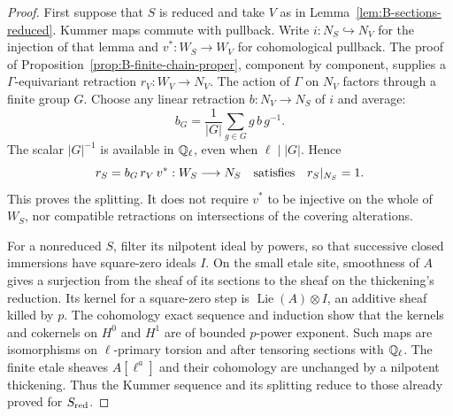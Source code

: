 \begin{proof}
First suppose that \(S\) is reduced and take \(V\) as in
Lemma~\ref{lem:B-sections-reduced}.  Kummer maps commute with
pullback.  Write \(i:N_S\hookrightarrow N_V\) for the
injection of that lemma and \(v^*:W_S\to W_V\) for
cohomological pullback.  The proof of
Proposition~\ref{prop:B-finite-chain-proper}, component by
component, supplies a \(\Gamma\)-equivariant retraction
\(r_V:W_V\to N_V\).  The action of \(\Gamma\) on
\(N_V\) factors through a finite group \(G\).  Choose any
linear retraction \(b:N_V\to N_S\) of \(i\) and average:
\[
 b_G=\frac1{|G|}\sum_{g\in G}g\,b\,g^{-1}.
\]
The scalar \(|G|^{-1}\) is available in \(\mathbb Q_\ell\),
even when \(\ell\mid |G|\).  Hence
\[
 r_S=b_G\,r_V\,v^*:W_S\longrightarrow N_S
 \quad\hbox{satisfies}\quad r_S|_{N_S}=1.
\]
This proves the splitting.  It does not require \(v^*\) to be
injective on the whole of \(W_S\), nor compatible retractions
on intersections of the covering alterations.

For a nonreduced \(S\), filter its nilpotent ideal by powers,
so that successive closed immersions have square-zero ideals
\(I\).  On the small etale site, smoothness of \(A\) gives
a surjection from the sheaf of its sections to the sheaf on the
thickening's reduction.  Its kernel for a square-zero step is
\(\operatorname{Lie}(A)\otimes I\), an additive sheaf killed
by \(p\).  The cohomology exact sequence and induction show
that the kernels and cokernels on \(H^0\) and \(H^1\) are
of bounded \(p\)-power exponent.  Such maps are isomorphisms
on \(\ell\)-primary torsion and after tensoring sections
with \(\mathbb Q_\ell\).  The finite etale sheaves
\(A[\ell^a]\) and their cohomology are unchanged by a
nilpotent thickening.  Thus the Kummer sequence and its splitting
reduce to those already proved for \(S_{\rm red}\).


\end{proof}

